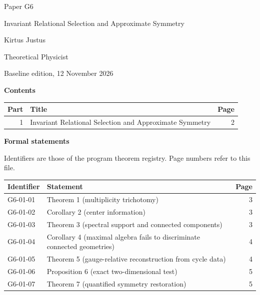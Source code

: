 \documentclass[11pt,a4paper]{article}
\begin{document}
\thispagestyle{empty}\pagestyle{empty}
{\small\sffamily \ProgramTitle\hfill Paper G6\par}
\vspace*{12mm}
{\LARGE\bfseries\raggedright{} Invariant Relational Selection and Approximate Symmetry\par}
\vspace{9mm}
{\large Kirtus Justus\par}\vspace{1mm}Theoretical Physicist\par\AuthorLocation\par\vspace{2mm}Baseline edition, 12 November 2026\par\vspace{8mm}
\textbf{Contents}\par\vspace{1mm}
{\small\begin{longtable}{@{}r>{\raggedright\arraybackslash}p{}r@{}}
\toprule Part & Title & Page\\\midrule\endhead
1 & Invariant Relational Selection and Approximate Symmetry & 2\\
\bottomrule\end{longtable}}
\vspace{2mm}\textbf{Formal statements}\par\vspace{1mm}
{\footnotesize Identifiers are those of the program theorem registry. Page numbers refer to this file.\par}
{\footnotesize\begin{longtable}{@{}l>{\raggedright\arraybackslash}p{}r@{}}
\toprule Identifier & Statement & Page\\\midrule\endhead
G6-01-01 & Theorem 1 (multiplicity trichotomy) & 3\\
G6-01-02 & Corollary 2 (center information) & 3\\
G6-01-03 & Theorem 3 (spectral support and connected components) & 3\\
G6-01-04 & Corollary 4 (maximal algebra fails to discriminate connected geometries) & 4\\
G6-01-05 & Theorem 5 (gauge-relative reconstruction from cycle data) & 4\\
G6-01-06 & Proposition 6 (exact two-dimensional test) & 5\\
G6-01-07 & Theorem 7 (quantified symmetry restoration) & 5\\
\bottomrule\end{longtable}}
\end{document}
